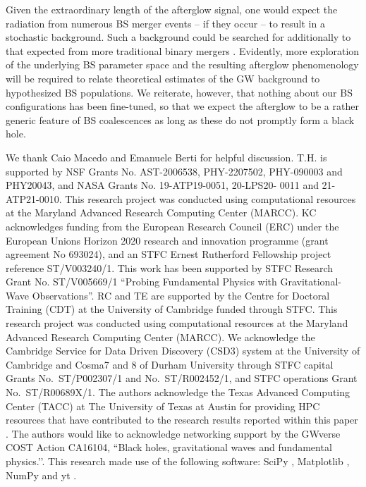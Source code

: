 \documentclass[11pt]{report}  %
\begin{document}
Given the extraordinary length of the afterglow signal, one
would expect the radiation from numerous BS merger events
-- if they occur -- to result in a stochastic background.
Such a background could be searched for additionally
to that expected from more traditional binary mergers
\cite{Croon:2018ftb}. Evidently, more exploration of the
underlying BS parameter space and the resulting afterglow
phenomenology will be required to relate theoretical
estimates of the GW background to hypothesized BS populations.
We reiterate, however, that nothing about our BS configurations
has been fine-tuned, so that we expect the afterglow to be a
rather generic feature of BS coalescences as long as these do 
not promptly form a black hole.


\acknowledgments We thank Caio Macedo and Emanuele Berti for helpful discussion.
T.H. is supported by NSF Grants No. AST-2006538, PHY-2207502, PHY-090003 and PHY20043, and NASA Grants No. 19-ATP19-0051, 20-LPS20- 0011 and 21-ATP21-0010. This research project was conducted using computational resources at the Maryland Advanced Research Computing Center (MARCC).
KC acknowledges funding from the European Research Council (ERC) under the European Unions Horizon 2020 research and innovation programme (grant agreement No 693024), and an STFC Ernest Rutherford Fellowship project reference ST/V003240/1.
This work has been supported by
STFC Research Grant No. ST/V005669/1
``Probing Fundamental Physics with Gravitational-Wave Observations''.
RC and TE are supported by the Centre for Doctoral Training
(CDT) at the University of Cambridge funded through STFC.
This research project was conducted using
computational resources at the Maryland Advanced Research Computing Center
(MARCC). We acknowledge the Cambridge Service for Data Driven Discovery (CSD3)
system at the University of Cambridge
and Cosma7 and 8 of Durham University through STFC capital Grants
No.~ST/P002307/1 and No.~ST/R002452/1, and STFC operations Grant
No.~ST/R00689X/1. The authors acknowledge the Texas Advanced Computing Center
(TACC) at The University of Texas at Austin for providing HPC resources that have contributed to the research results
reported within this paper \cite{10.1145/3311790.3396656}. The authors would
like to acknowledge networking support by the GWverse COST Action CA16104,
``Black holes, gravitational waves and fundamental physics.’’. This research
made use of the following software: SciPy \cite{jones_scipy_2001},  Matplotlib
\cite{Hunter:2007}, NumPy \cite{van2011numpy} and yt \cite{Turk_2010}.

\end{document}
